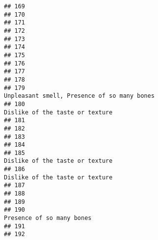 \documentclass[
]{article}
\begin{document}
\begin{verbatim}
## 169                                                                                                        
## 170                                                                                                        
## 171                                                                                                        
## 172                                                                                                        
## 173                                                                                                        
## 174                                                                                                        
## 175                                                                                                        
## 176                                                                                                        
## 177                                                                                                        
## 178                                                                                                        
## 179                                                             Unpleasant smell, Presence of so many bones
## 180                                                                         Dislike of the taste or texture
## 181                                                                                                        
## 182                                                                                                        
## 183                                                                                                        
## 184                                                                                                        
## 185                                                                         Dislike of the taste or texture
## 186                                                                         Dislike of the taste or texture
## 187                                                                                                        
## 188                                                                                                        
## 189                                                                                                        
## 190                                                                               Presence of so many bones
## 191                                                                                                        
## 192                                                                                                        

\end{verbatim}
\end{document}
